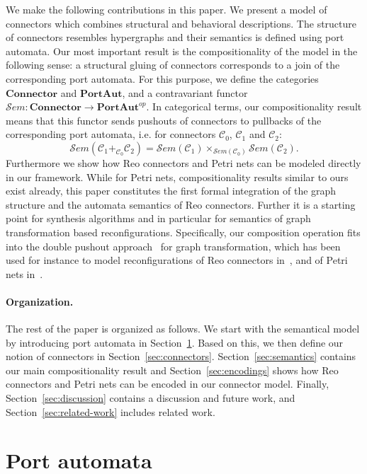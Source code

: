 \documentclass[copyright,creativecommons]{eptcs}
\newcommand{\PA}{\ensuremath{\mathbf{PortAut}}}
\newcommand{\Connector}{\ensuremath{\mathbf{Connector}}}
\newcommand{\Sem}{\ensuremath{\mathcal{S}em}}
\newcommand{\C}{\ensuremath{\mathcal{C}}}
\begin{document}
We make the following contributions in this paper. We present
a model of connectors which combines 
structural and behavioral descriptions.
The structure of connectors resembles hypergraphs and their
semantics is defined using port automata. 
Our most important result is the compositionality of the model 
in the following sense: a structural gluing of connectors 
corresponds to a join of the corresponding port automata.
For this purpose, we define the categories {\Connector} and 
{\PA}, and a contravariant functor $\Sem: \Connector \to \PA^{op}$.
In categorical terms, our compositionality result means that this
functor sends pushouts of connectors to pullbacks of the 
corresponding port automata, i.e. for connectors $\C_0$, $\C_1$ and
$\C_2$:
\[
\Sem(\C_1 +_{\C_0} \C_2) = \Sem(\C_1) \times_{\Sem(\C_0)} \Sem(\C_2).
\]
Furthermore we show how Reo connectors and Petri nets can be modeled
directly in our framework. While for Petri nets, compositionality results 
similar to ours exist already, this paper constitutes the first 
formal integration of the graph structure and the automata semantics 
of Reo connectors. Further it is a starting point for synthesis 
algorithms and in particular for semantics of graph transformation 
based reconfigurations.  Specifically, our composition operation fits into the 
double pushout approach~\cite{DPO,EEPT06} for graph transformation,
which has been used for instance to model reconfigurations 
of Reo connectors in~\cite{KMLA10}, and of Petri nets 
in~\cite{PER01}.


\paragraph{Organization.} The rest of the paper is organized
as follows. We start with the semantical model by introducing
port automata in Section~\ref{sec:port-automata}. Based on this,
we then define our notion of connectors in Section~\ref{sec:connectors}.
Section~\ref{sec:semantics} contains our main compositionality
result and Section~\ref{sec:encodings} shows how Reo connectors
and Petri nets can be encoded in our connector model.
Finally, Section~\ref{sec:discussion} contains a discussion and 
future work, and Section~\ref{sec:related-work} includes related work.



 
\vspace{0.5cm}
\section{Port automata}
\label{sec:port-automata}
\end{document}
